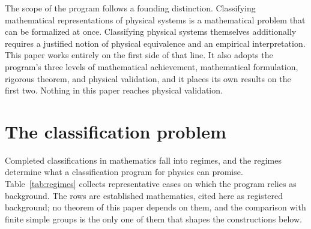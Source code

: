 \documentclass[11pt,letterpaper]{article}
\theoremstyle{definition}
\theoremstyle{remark}
\begin{document}
The scope of the program follows a founding distinction. Classifying mathematical representations of physical systems is a mathematical problem that can be formalized at once. Classifying physical systems themselves additionally requires a justified notion of physical equivalence and an empirical interpretation. This paper works entirely on the first side of that line. It also adopts the program's three levels of mathematical achievement, mathematical formulation, rigorous theorem, and physical validation, and it places its own results on the first two. Nothing in this paper reaches physical validation.

\section{The classification problem}
\label{sec:problem}

Completed classifications in mathematics fall into regimes, and the regimes determine what a classification program for physics can promise. Table~\ref{tab:regimes} collects representative cases on which the program relies as background. The rows are established mathematics, cited here as registered background; no theorem of this paper depends on them, and the comparison with finite simple groups is the only one of them that shapes the constructions below.
\end{document}
